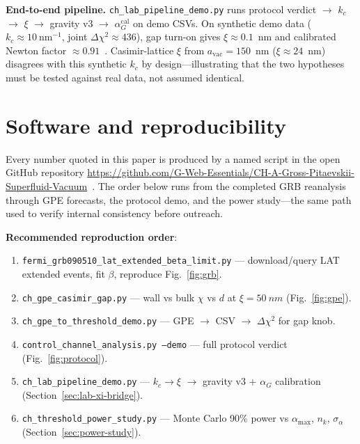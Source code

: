 \documentclass[11pt,a4paper]{article}
\begin{document}
\textbf{End-to-end pipeline.}
\texttt{ch\_lab\_pipeline\_demo.py} runs protocol verdict $\to$ $k_c$ $\to$ $\xi$ $\to$ gravity v3 $\to$ $\alpha_G^{\mathrm{cal}}$ on demo CSVs.
On synthetic demo data ($k_c \approx 10~\mathrm{nm}^{-1}$, joint $\Delta\chi^2 \approx 436$), gap turn-on gives $\xi \approx 0.1$~nm and calibrated Newton factor $\approx 0.91$~\cite{CHSpaceFabric2026}.
Casimir-lattice $\xi$ from $a_{\mathrm{vac}} = 150$~nm ($\xi \approx 24$~nm) disagrees with this synthetic $k_c$ by design---illustrating that the two hypotheses must be tested against real data, not assumed identical.

\section{Software and reproducibility}
\label{sec:software}

Every number quoted in this paper is produced by a named script in the open GitHub repository \url{https://github.com/G-Web-Essentials/CH-A-Gross-Pitaevskii-Superfluid-Vacuum}~\cite{CHSpaceFabric2026}.
The order below runs from the completed GRB reanalysis through GPE forecasts, the protocol demo, and the power study---the same path used to verify internal consistency before outreach.

\textbf{Recommended reproduction order}:
\begin{enumerate}[label=\arabic*., leftmargin=*]
  \item \texttt{fermi\_grb090510\_lat\_extended\_beta\_limit.py} --- download/query LAT extended events, fit $\beta$, reproduce Fig.~\ref{fig:grb}.
  \item \texttt{ch\_gpe\_casimir\_gap.py} --- wall vs bulk $\chi$ vs $d$ at $\xi = \SI{50}{nm}$ (Fig.~\ref{fig:gpe}).
  \item \texttt{ch\_gpe\_to\_threshold\_demo.py} --- GPE $\to$ CSV $\to$ $\Delta\chi^2$ for gap knob.
  \item \texttt{control\_channel\_analysis.py --demo} --- full protocol verdict (Fig.~\ref{fig:protocol}).
  \item \texttt{ch\_lab\_pipeline\_demo.py} --- $k_c \to \xi$ $\to$ gravity v3 $+$ $\alpha_G$ calibration (Section~\ref{sec:lab-xi-bridge}).
  \item \texttt{ch\_threshold\_power\_study.py} --- Monte Carlo 90\% power vs $\alpha_{\max}$, $n_k$, $\sigma_\alpha$ (Section~\ref{sec:power-study}).
\end{enumerate}
\end{document}
